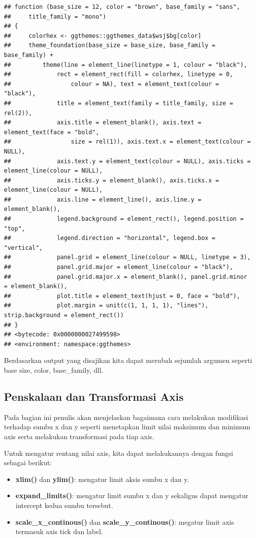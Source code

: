 \documentclass[]{book}
\providecommand{\tightlist}{%
  \setlength{\itemsep}{0pt}\setlength{\parskip}{0pt}}
\begin{document}
\begin{verbatim}
## function (base_size = 12, color = "brown", base_family = "sans", 
##     title_family = "mono") 
## {
##     colorhex <- ggthemes::ggthemes_data$wsj$bg[color]
##     theme_foundation(base_size = base_size, base_family = base_family) + 
##         theme(line = element_line(linetype = 1, colour = "black"), 
##             rect = element_rect(fill = colorhex, linetype = 0, 
##                 colour = NA), text = element_text(colour = "black"), 
##             title = element_text(family = title_family, size = rel(2)), 
##             axis.title = element_blank(), axis.text = element_text(face = "bold", 
##                 size = rel(1)), axis.text.x = element_text(colour = NULL), 
##             axis.text.y = element_text(colour = NULL), axis.ticks = element_line(colour = NULL), 
##             axis.ticks.y = element_blank(), axis.ticks.x = element_line(colour = NULL), 
##             axis.line = element_line(), axis.line.y = element_blank(), 
##             legend.background = element_rect(), legend.position = "top", 
##             legend.direction = "horizontal", legend.box = "vertical", 
##             panel.grid = element_line(colour = NULL, linetype = 3), 
##             panel.grid.major = element_line(colour = "black"), 
##             panel.grid.major.x = element_blank(), panel.grid.minor = element_blank(), 
##             plot.title = element_text(hjust = 0, face = "bold"), 
##             plot.margin = unit(c(1, 1, 1, 1), "lines"), strip.background = element_rect())
## }
## <bytecode: 0x0000000027499598>
## <environment: namespace:ggthemes>
\end{verbatim}

Berdasarkan output yang disajikan kita dapat merubah sejumlah argumen
seperti base size, color, base\_family, dll.

\subsection{Penskalaan dan Transformasi
Axis}\label{penskalaan-dan-transformasi-axis}

Pada bagian ini penulis akan menjelaskan bagaimana cara melakukan
modifikasi terhadap sumbu x dan y seperti menetapkan limit nilai
maksimum dan minimum axis serta melakukan transformasi pada tiap axis.

Untuk mengatur rentang nilai axis, kita dapat melakukannya dengan fungsi
sebagai berikut:

\begin{itemize}
\tightlist
\item
  \textbf{xlim()} dan \textbf{ylim()}: mengatur limit aksis sumbu x dan
  y.
\item
  \textbf{expand\_limits()}: mengatur limit sumbu x dan y sekaligus
  dapat mengatur intercept kedua sumbu tersebut.
\item
  \textbf{scale\_x\_continous()} dan \textbf{scale\_y\_continous()}:
  megatur limit axis termasuk axis tick dan label.
\end{itemize}
\end{document}
